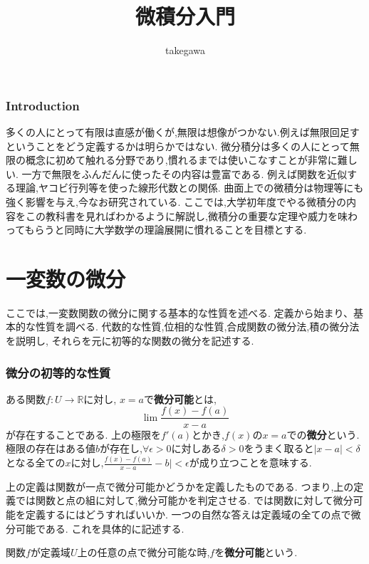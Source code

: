 \documentclass{ujarticle}
\title{微積分入門}
\author{takegawa}
\date{}
\begin{document}
\maketitle
\tableofcontents
\section{Introduction}
多くの人にとって有限は直感が働くが,無限は想像がつかない.例えば無限回足すということをどう定義するかは明らかではない.
微分積分は多くの人にとって無限の概念に初めて触れる分野であり,慣れるまでは使いこなすことが非常に難しい.
一方で無限をふんだんに使ったその内容は豊富である.
例えば関数を近似する理論,ヤコビ行列等を使った線形代数との関係.
曲面上での微積分は物理等にも強く影響を与え,今なお研究されている.
ここでは,大学初年度でやる微積分の内容をこの教科書を見ればわかるように解説し,微積分の重要な定理や威力を味わってもらうと同時に大学数学の理論展開に慣れることを目標とする.

\part{一変数の微分}
ここでは,一変数関数の微分に関する基本的な性質を述べる.
定義から始まり、基本的な性質を調べる.
代数的な性質,位相的な性質,合成関数の微分法,積の微分法を説明し,
それらを元に初等的な関数の微分を記述する.
\section{微分の初等的な性質}

\begin{dfn}[微分]
ある関数$f:U \to \mathbb{R}$に対し,
$x=a$で\textbf{微分可能}とは,
\begin{equation*}
\lim \frac{f(x) - f(a)}{x-a}
\end{equation*}
が存在することである.
上の極限を$f'(a)$とかき,$f(x)$の$x=a$での\textbf{微分}という.
極限の存在はある値$b$が存在し,$\forall \epsilon > 0$に対しある$\delta > 0$をうまく取ると$|x - a| < \delta$となる全ての$x$に対し,$\frac{f(x) - f(a)}{x-a} - b| < \epsilon$が成り立つことを意味する.
\end{dfn}

上の定義は関数が一点で微分可能かどうかを定義したものである.
つまり,上の定義では関数と点の組に対して,微分可能かを判定させる.
では関数に対して微分可能を定義するにはどうすればいいか.
一つの自然な答えは定義域の全ての点で微分可能である.
これを具体的に記述する.
\begin{dfn}
関数$f$が定義域$U$上の任意の点で微分可能な時,$f$を\textbf{微分可能}という.
\end{dfn}
\end{document}
